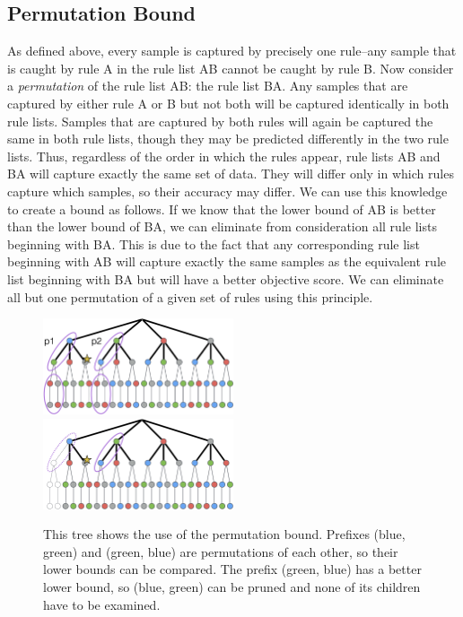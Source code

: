 \documentclass[]{report}
\theoremstyle{definition}
\begin{document}
\subsection{Permutation Bound}

As defined above, every sample is captured by precisely one rule--any sample that is caught by rule A in the rule list AB cannot be caught by rule B. 
Now consider a \textit{permutation} of the rule list AB: the rule list BA.
Any samples that are captured by either rule A or B but not both will be captured identically in both rule lists.
Samples that are captured by both rules will again be captured the same in both rule lists, though they may be predicted differently in the two rule lists.
Thus, regardless of the order in which the rules appear, rule lists AB and BA will capture exactly the same set of data.
They will differ only in which rules capture which samples, so their accuracy may differ. 
We can use this knowledge to create a bound as follows.
If we know that the lower bound of AB is better than the lower bound of BA, we can eliminate from consideration all rule lists beginning with BA.
This is due to the fact that any corresponding rule list beginning with AB will capture exactly the same samples as the equivalent rule list beginning with BA but will have a better objective score.
We can eliminate all but one permutation of a given set of rules using this principle.

\begin{figure}
\includegraphics[width=0.5\textwidth]{figs/ela_branch-and-bound-permutations.png}
\includegraphics[width=0.5\textwidth]{figs/ela_branch-and-bound-permutations-pruned.png}
\caption[Permutation bound]{This tree shows the use of the permutation bound. Prefixes (blue, green) and (green, blue) are permutations of each other, so their lower bounds can be compared. The prefix (green, blue) has a better lower bound, so (blue, green) can be pruned and none of its children have to be examined.
\label{fig:permutation-bound}}
\end{figure}
\end{document}
